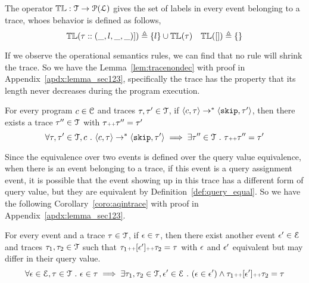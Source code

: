     The operator $\mathbb{TL} : \mathcal{T} \to \mathcal{P}{(\mathcal{L})}$ gives the set of labels in every event belonging to 
    a trace, whoes behavior is defined as follows,
  \[
  \mathbb{TL}{(\mathtt{\tau}  :: (\_, l, \_, \_)])} \triangleq \{l\} \cup \mathbb{TL}{(\mathtt{\tau} )}
  ~~~
  \mathbb{TL}({[ ]}) \triangleq \{\}
  \]
  
  If we observe the operational semantics rules, we can find that no rule will shrink the trace. 
  So we have the Lemma~\ref{lem:tracenondec} with proof in Appendix~\ref{apdx:lemma_sec123}, 
  specifically the trace has the property that its length never decreases during the program execution.
  \begin{lem}
  \label{lem:tracenondec}
  For every program $c \in \mathcal{C}$ and traces $\mathtt{\tau}, \mathtt{\tau}' \in \mathcal{T}$, if 
  $\langle c, \mathtt{\tau} \rangle \rightarrow^{*} \langle \mathtt{skip}, \mathtt{\tau}' \rangle$,
  then there exists a trace $\mathtt{\tau}'' \in \mathcal{T}$ with $\mathtt{\tau} {\scriptscriptstyle ++} \mathtt{\tau}'' = \mathtt{\tau}'$
  $$
  \forall \mathtt{\tau}, \mathtt{\tau}' \in \mathcal{T}, c ~.~ 
  \langle c, \mathtt{\tau} \rangle \rightarrow^{*} \langle \mathtt{skip}, \mathtt{\tau}' \rangle 
  \implies \exists \mathtt{\tau}'' \in \mathcal{T} ~.~ \mathtt{\tau} {\scriptscriptstyle ++} \mathtt{\tau}'' = \mathtt{\tau}'
  $$
  \end{lem}
  Since the equivalence over two events is defined over the query value equivalence, 
  when there is an event belonging to a trace, 
  if this event is a query assignment event, 
  it is possible that 
  the event showing up in this trace has a different form of query value, 
  but they are equivalent by Definition~\ref{def:query_equal}.
  So we have the following Corollary~\ref{coro:aqintrace} with proof in Appendix~\ref{apdx:lemma_sec123}.
  \begin{coro}
  \label{coro:aqintrace}
  For every event and a trace $\mathtt{\tau} \in \mathcal{T}$,
  if $\mathtt{\epsilon} \in \mathtt{\tau}$, 
  then there exist another event $\mathtt{\epsilon}' \in \mathcal{E}$ and traces $\mathtt{\tau}_1, \mathtt{\tau}_2 \in \mathcal{T}$
  such that $\mathtt{\tau}_1 {\scriptscriptstyle ++} [\mathtt{\epsilon}'] {\scriptscriptstyle ++} \mathtt{\tau}_2 = \mathtt{\tau} $
  with 
  $\mathtt{\epsilon}$ and $\mathtt{\epsilon}'$ equivalent but may differ in their query value.
  \[
    \forall \mathtt{\epsilon} \in \mathcal{E}, \mathtt{\tau} \in \mathcal{T} ~.~ 
  \mathtt{\epsilon} \in \mathtt{\tau} \implies \exists \mathtt{\tau}_1, \mathtt{\tau}_2 \in \mathcal{T}, 
  \mathtt{\epsilon}' \in \mathcal{E} ~.~ (\mathtt{\epsilon} \in \mathtt{\epsilon}') \land \mathtt{\tau}_1 {\scriptscriptstyle ++} [\mathtt{\epsilon}'] {\scriptscriptstyle ++} \mathtt{\tau}_2 = \mathtt{\tau}  
  \]
  \end{coro}
%  
